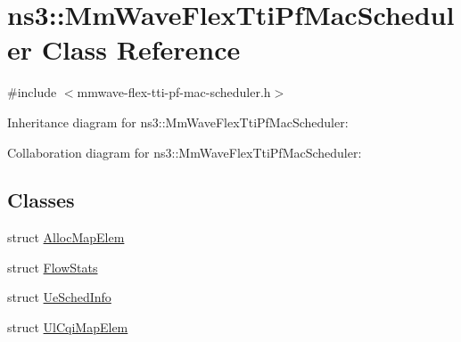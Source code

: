 \hypertarget{classns3_1_1MmWaveFlexTtiPfMacScheduler}{}\section{ns3\+:\+:Mm\+Wave\+Flex\+Tti\+Pf\+Mac\+Scheduler Class Reference}
\label{classns3_1_1MmWaveFlexTtiPfMacScheduler}


{\ttfamily \#include $<$mmwave-\/flex-\/tti-\/pf-\/mac-\/scheduler.\+h$>$}



Inheritance diagram for ns3\+:\+:Mm\+Wave\+Flex\+Tti\+Pf\+Mac\+Scheduler\+:


Collaboration diagram for ns3\+:\+:Mm\+Wave\+Flex\+Tti\+Pf\+Mac\+Scheduler\+:
\subsection*{Classes}
\begin{DoxyCompactItemize}
\item 
struct \hyperlink{structns3_1_1MmWaveFlexTtiPfMacScheduler_1_1AllocMapElem}{Alloc\+Map\+Elem}
\item 
struct \hyperlink{structns3_1_1MmWaveFlexTtiPfMacScheduler_1_1FlowStats}{Flow\+Stats}
\item 
struct \hyperlink{structns3_1_1MmWaveFlexTtiPfMacScheduler_1_1UeSchedInfo}{Ue\+Sched\+Info}
\item 
struct \hyperlink{structns3_1_1MmWaveFlexTtiPfMacScheduler_1_1UlCqiMapElem}{Ul\+Cqi\+Map\+Elem}
\end{DoxyCompactItemize}
